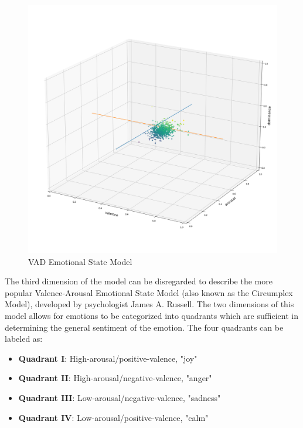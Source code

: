 \documentclass[11pt]{article}
\begin{document}
\begin{figure}[!ht]
  \includegraphics[scale=0.35]{../statics/vad.png}
  \centering
  \caption{VAD Emotional State Model}
  \label{fig:vad}
\end{figure}

The third dimension of the model can be disregarded to describe the more popular Valence-Arousal Emotional State Model (also known as the Circumplex Model), developed by psychologist James A. Russell. The two dimensions of this model allows for emotions to be categorized into quadrants which are sufficient in determining the general sentiment of the emotion. The four quadrants can be labeled as:
\begin{itemize}
  \item \textbf{Quadrant I}: High-arousal/positive-valence, "joy"
  \item \textbf{Quadrant II}: High-arousal/negative-valence, "anger"
  \item \textbf{Quadrant III}: Low-arousal/negative-valence, "sadness"
  \item \textbf{Quadrant IV}: Low-arousal/positive-valence, "calm"
\end{itemize}
\end{document}
